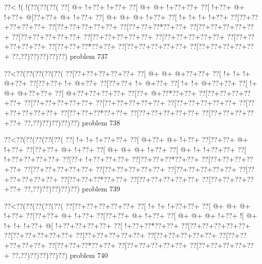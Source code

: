 \vbox{\vbox{\goo
\0??<\- !(\- !(\0??(\0??(\0??(
\0??[\- @+\- !+\0??+\- !+\0??+
\0??[\- @+\- @+\- !+\0??+\0??+
\0??[\- !+\0??+\- @+\- !+\0??+
\- @[\0??+\0??+\- @+\- !+\0??+
\0??[\- @+\- @+\- @+\- !+\0??+
\0??[\- !+\- !+\- !+\- !+\0??+
\0??[\0??+\0??+\0??+\0??+\0??+
\0??[\0??+\0??+\0??+\0??+\0??+
\0??[\0??+\0??+\0??*\0??+\0??+
\0??[\0??+\0??+\0??+\0??+\0??+
\0??[\0??+\0??+\0??+\0??+\0??+
\0??[\0??+\0??+\0??+\0??+\0??+
\0??[\0??+\0??+\0??+\0??+\0??+
\0??[\0??+\0??+\0??+\0??+\0??+
\0??[\0??+\0??+\0??*\0??+\0??+
\0??[\0??+\0??+\0??+\0??+\0??+
\0??[\0??+\0??+\0??+\0??+\0??+
\0??,\0??)\0??)\0??)\0??)\0??)
}
\hfil problem 737\hfil\break
}

\vbox{\vbox{\goo
\0??<\0??(\0??(\0??(\0??(\0??(
\0??[\0??+\0??+\0??+\0??+\0??+
\0??[\- @+\- @+\- @+\0??+\0??+
\0??[\- !+\- !+\- !+\- @+\0??+
\0??[\0??+\0??+\- !+\- @+\0??+
\0??[\0??+\0??+\- !+\- @+\0??+
\0??[\- !+\- !+\- @+\0??+\0??+
\0??[\- !+\- @+\- @+\0??+\0??+
\0??[\- @+\0??+\0??+\0??+\0??+
\0??[\0??+\- @+\0??*\0??+\0??+
\0??[\0??+\0??+\0??+\0??+\0??+
\0??[\0??+\0??+\0??+\0??+\0??+
\0??[\0??+\0??+\0??+\0??+\0??+
\0??[\0??+\0??+\0??+\0??+\0??+
\0??[\0??+\0??+\0??+\0??+\0??+
\0??[\0??+\0??+\0??*\0??+\0??+
\0??[\0??+\0??+\0??+\0??+\0??+
\0??[\0??+\0??+\0??+\0??+\0??+
\0??,\0??)\0??)\0??)\0??)\0??)
}
\hfil problem 738\hfil\break
}

\vbox{\vbox{\goo
\0??<\0??(\0??(\0??(\0??(\0??(
\0??[\- !+\- !+\- !+\0??+\0??+
\0??[\- @+\0??+\- @+\- !+\0??+
\0??[\0??+\0??+\- @+\- !+\0??+
\0??[\0??+\0??+\- @+\- !+\0??+
\0??[\- @+\- @+\- @+\- !+\0??+
\0??[\- @+\- !+\- !+\0??+\0??+
\0??[\- !+\0??+\0??+\0??+\0??+
\0??[\0??+\- !+\0??+\0??+\0??+
\0??[\0??+\0??+\0??*\0??+\0??+
\0??[\0??+\0??+\0??+\0??+\0??+
\0??[\0??+\0??+\0??+\0??+\0??+
\0??[\0??+\0??+\0??+\0??+\0??+
\0??[\0??+\0??+\0??+\0??+\0??+
\0??[\0??+\0??+\0??+\0??+\0??+
\0??[\0??+\0??+\0??*\0??+\0??+
\0??[\0??+\0??+\0??+\0??+\0??+
\0??[\0??+\0??+\0??+\0??+\0??+
\0??,\0??)\0??)\0??)\0??)\0??)
}
\hfil problem 739\hfil\break
}

\vbox{\vbox{\goo
\0??<\0??(\0??(\0??(\0??(\0??(
\0??[\0??+\0??+\0??+\0??+\0??+
\0??[\- !+\- !+\- !+\0??+\0??+
\0??[\- @+\- @+\- @+\- !+\0??+
\0??[\0??+\0??+\- @+\- !+\0??+
\0??[\0??+\0??+\- @+\- !+\0??+
\0??[\- @+\- @+\- @+\- !+\0??+
\- ![\- @+\- !+\- !+\- !+\0??+
\- @[\- !+\0??+\0??+\0??+\0??+
\0??[\- !+\0??+\0??*\0??+\0??+
\0??[\0??+\0??+\0??+\0??+\0??+
\0??[\0??+\0??+\0??+\0??+\0??+
\0??[\0??+\0??+\0??+\0??+\0??+
\0??[\0??+\0??+\0??+\0??+\0??+
\0??[\0??+\0??+\0??+\0??+\0??+
\0??[\0??+\0??+\0??*\0??+\0??+
\0??[\0??+\0??+\0??+\0??+\0??+
\0??[\0??+\0??+\0??+\0??+\0??+
\0??,\0??)\0??)\0??)\0??)\0??)
}
\hfil problem 740\hfil\break
}

